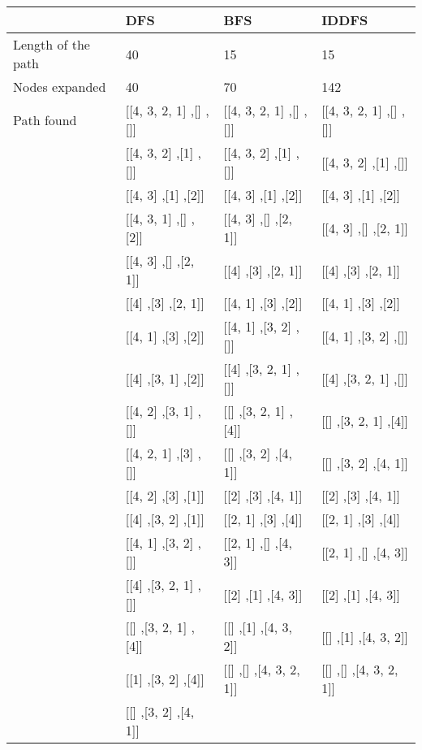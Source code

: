 \begin{table}[h]
\centering
\begin{tabular}{|l|l|l|l|}
\hline
					& DFS	& BFS	& IDDFS	\\
\hline
Length of the path	&  40	&  15	& 15 	\\
\hline
Nodes expanded		&  40	&  70	& 142	\\
\hline
Path found			
                & [[4, 3, 2, 1] ,[] ,[]] & [[4, 3, 2, 1] ,[] ,[]] & [[4, 3, 2, 1] ,[] ,[]]\\
                & [[4, 3, 2] ,[1] ,[]]   & [[4, 3, 2] ,[1] ,[]]   & [[4, 3, 2] ,[1] ,[]]  \\
                & [[4, 3] ,[1] ,[2]]     & [[4, 3] ,[1] ,[2]]     & [[4, 3] ,[1] ,[2]]    \\
                & [[4, 3, 1] ,[] ,[2]]   & [[4, 3] ,[] ,[2, 1]]   & [[4, 3] ,[] ,[2, 1]]  \\
                & [[4, 3] ,[] ,[2, 1]]   & [[4] ,[3] ,[2, 1]]     & [[4] ,[3] ,[2, 1]]    \\
                & [[4] ,[3] ,[2, 1]]     & [[4, 1] ,[3] ,[2]]     & [[4, 1] ,[3] ,[2]]    \\
                & [[4, 1] ,[3] ,[2]]     & [[4, 1] ,[3, 2] ,[]]   & [[4, 1] ,[3, 2] ,[]]  \\
                & [[4] ,[3, 1] ,[2]]     & [[4] ,[3, 2, 1] ,[]]   & [[4] ,[3, 2, 1] ,[]]  \\
                & [[4, 2] ,[3, 1] ,[]]   & [[] ,[3, 2, 1] ,[4]]   & [[] ,[3, 2, 1] ,[4]]  \\
                & [[4, 2, 1] ,[3] ,[]]   & [[] ,[3, 2] ,[4, 1]]   & [[] ,[3, 2] ,[4, 1]]  \\
                & [[4, 2] ,[3] ,[1]]     & [[2] ,[3] ,[4, 1]]     & [[2] ,[3] ,[4, 1]]    \\
                & [[4] ,[3, 2] ,[1]]     & [[2, 1] ,[3] ,[4]]     & [[2, 1] ,[3] ,[4]]    \\
                & [[4, 1] ,[3, 2] ,[]]   & [[2, 1] ,[] ,[4, 3]]   & [[2, 1] ,[] ,[4, 3]]  \\
                & [[4] ,[3, 2, 1] ,[]]   & [[2] ,[1] ,[4, 3]]     & [[2] ,[1] ,[4, 3]]    \\
                & [[] ,[3, 2, 1] ,[4]]   & [[] ,[1] ,[4, 3, 2]]   & [[] ,[1] ,[4, 3, 2]]  \\
                & [[1] ,[3, 2] ,[4]]     & [[] ,[] ,[4, 3, 2, 1]] & [[] ,[] ,[4, 3, 2, 1]]\\
                & [[] ,[3, 2] ,[4, 1]]   & &                                              \\

\end{tabular}
\end{table}
